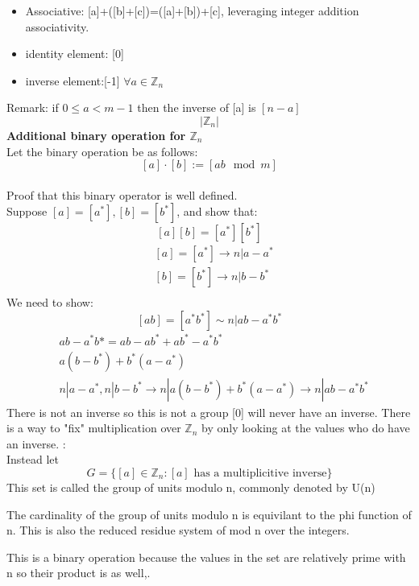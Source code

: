 \documentclass[11pt]{article}
\theoremstyle{definition}  %
\newcommand{\Z}{\mathbb{Z}}
\begin{document}
  \begin{itemize}
    \item Associative: [a]+([b]+[c])=([a]+[b])+[c], leveraging integer addition associativity.
    \item identity element: [0]
    \item inverse element:[-1] $\forall a \in \Z_n$
  \end{itemize}
Remark: if $0\leq a<m-1$ then the inverse of [a] is $[n-a]$\\
\[
  |\Z_n|
\]
\textbf{Additional binary operation for $\Z_n$}\\
Let the binary operation be as follows:
\[
  [a]\cdot [b]:=[ab\mod m ]
\]\\
Proof that this binary operator is well defined. \\
Suppose $[a]=[a^*], [b]=[b^*]$, and show that:
\[
  [a][b]=[a^*][b^*]
\]
\begin{align*}
  &[a]=[a^*]\rightarrow n|a-a^*\\
  &[b]=[b^*]\rightarrow n|b-b^*\\
\end{align*}
We need to show:
\[
  [ab]=[a^*b^*]\sim n|ab-a^*b^*
\]
\begin{align*}
  &ab-a^*b*=ab-ab^*+ab^*-a^*b^*\\
  &a(b-b^*)+b^*(a-a^*)\\
  &n|a-a^*,n|b-b^*\rightarrow n|a(b-b^*)+b^*(a-a^*)\rightarrow n|ab-a^*b^*
\end{align*}
There is not an inverse so this is not a group [0] will never have an inverse.
There is a way to "fix" multiplication over $\Z_n$ by only looking at the values who do have an inverse. :
\\
 Instead let $$G=\{[a]\in \Z_n: [a] \text{ has a multiplicitive inverse}\}$$ This set is called the group of units modulo n, commonly denoted by U(n)

The cardinality of the group of units modulo n is equivilant to the phi function of n. This is also the reduced residue system of mod n over the integers.

This is a binary operation because the values in the set are relatively prime with n so their product is as well,.  
\end{document}
